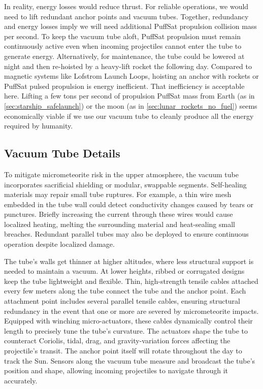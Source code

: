 \documentclass{article}
\begin{document}
In reality, energy losses would reduce thrust.   For reliable operations, we would need to lift redundant anchor points and vacuum tubes.  Together, redundancy and energy losses imply we will need additional PuffSat propulsion collision mass per second.  To keep the vacuum tube aloft, PuffSat propulsion must remain continuously active even when incoming projectiles cannot enter the tube to generate energy. Alternatively, for maintenance, the tube could be lowered at night and then re-hoisted by a heavy-lift rocket the following day.  Compared to magnetic systems like Lofstrom Launch Loops, hoisting an anchor with rockets or PuffSat pulsed propulsion is energy inefficient. That inefficiency is acceptable here. Lifting a few tons per second of propulsion PuffSat mass from Earth (as in \autoref{sec:starship_safelaunch}) or the moon (as in \autoref{sec:lunar_rockets_no_fuel}) seems economically viable if we use our vacuum tube to cleanly produce all the energy required by humanity.

\subsection{Vacuum Tube Details}\label{sec:vacuum_tube_details}
To mitigate micrometeorite risk in the upper atmosphere, the vacuum tube incorporates sacrificial shielding or modular, swappable segments. Self-healing materials \cite{self_healing_material_survey} may repair small tube ruptures.  For example, a thin wire mesh embedded in the tube wall could detect conductivity changes caused by tears or punctures. Briefly increasing the current through these wires would cause localized heating, melting the surrounding material and heat-sealing small breaches. Redundant parallel tubes may also be deployed to ensure continuous operation despite localized damage.  

The tube's walls get thinner at higher altitudes, where less structural support is needed to maintain a vacuum.  At lower heights, ribbed or corrugated designs  keep the tube lightweight and flexible. Thin, high-strength tensile cables attached every few meters along the tube connect the tube and the anchor point.  Each attachment point includes several parallel tensile cables, ensuring structural redundancy in the event that one or more are severed by micrometeorite impacts.   Equipped with winching micro-actuators, these cables dynamically control their length to precisely tune the tube's curvature. The actuators shape the tube to counteract Coriolis, tidal, drag, and gravity-variation forces affecting the projectile's transit. The anchor point itself will rotate throughout the day to track the Sun.  Sensors along the vacuum tube measure and broadcast the tube's position and shape, allowing incoming projectiles to navigate through it accurately.
\end{document}
